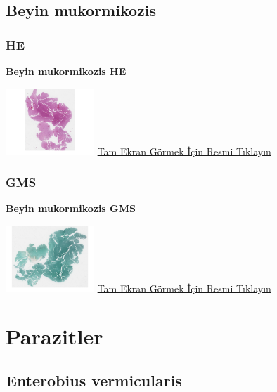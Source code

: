 \documentclass[
  letterpaper,
  DIV=11,
  numbers=noendperiod]{scrreprt}
\begin{document}
\hypertarget{sec-beyin-mukormikozis}{%
\section{Beyin mukormikozis}\label{sec-beyin-mukormikozis}}

\hypertarget{he-5}{%
\subsection{HE}\label{he-5}}

\textbf{Beyin mukormikozis HE}

\href{https://images.patolojiatlasi.com/brain-mucormycosis/HE.html}{\includegraphics[width=0.25\textwidth,height=\textheight]{./screenshots/thumbnail_brain-mucormycosis.png}}
\href{https://images.patolojiatlasi.com/brain-mucormycosis/HE.html}{Tam
Ekran Görmek İçin Resmi Tıklayın}

\hypertarget{gms}{%
\subsection{GMS}\label{gms}}

\textbf{Beyin mukormikozis GMS}

\href{https://images.patolojiatlasi.com/brain-mucormycosis/GMS.html}{\includegraphics[width=0.25\textwidth,height=\textheight]{./screenshots/thumbnail_brain-mucormycosis-GMS.png}}
\href{https://images.patolojiatlasi.com/brain-mucormycosis/GMS.html}{Tam
Ekran Görmek İçin Resmi Tıklayın}

\hypertarget{sec-parazitler}{%
\chapter{Parazitler}\label{sec-parazitler}}

\hypertarget{sec-enterobius-vermicularis}{%
\section{Enterobius vermicularis}\label{sec-enterobius-vermicularis}}
\end{document}
